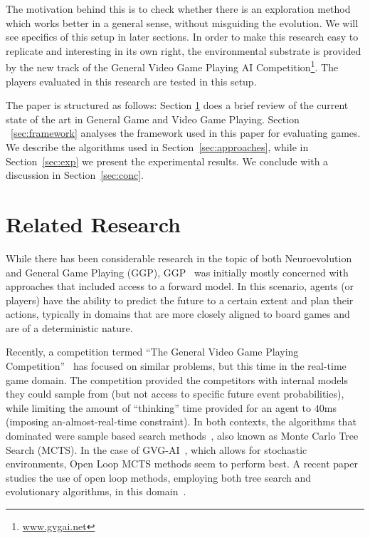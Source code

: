 \documentclass[conference]{IEEEtran}
\begin{document}
The motivation behind this is to check whether there is an exploration method which works better in a general sense, without misguiding the evolution. We will see specifics of this setup in later sections. In order to make this research easy to replicate and interesting in its own right, the environmental substrate is provided by the new track of the General Video Game Playing AI Competition\footnote{\url{www.gvgai.net}}. The players evaluated in this research are tested in this setup.

The paper is structured as follows: Section \ref{sec:lit} does a brief review of the current state of the art in General Game and Video Game Playing. Section ~\ref{sec:framework} analyses the framework used in this paper for evaluating games. We describe the algorithms used in Section~\ref{sec:approaches}, while in Section~\ref{sec:exp} we present the experimental results. We conclude with a discussion in Section~\ref{sec:conc}. 
 
\section{Related Research} \label{sec:lit}

While there has been considerable research in the topic of both Neuroevolution and General Game Playing (GGP), GGP~\cite{genesereth2005general} was initially mostly concerned with approaches that included access to a forward model. In this scenario, agents (or players) have the ability to predict the future to a certain extent and plan their actions, typically in domains that are more closely aligned to board games and are of a deterministic nature.

Recently, a competition termed ``The General Video Game Playing Competition''~\cite{Perez2015} has focused on similar problems, but this time in the real-time game domain. The competition provided the competitors with internal models they could sample from (but not access to specific future event probabilities), while limiting the amount of ``thinking'' time provided for an agent to $40$ms (imposing an-almost-real-time constraint). In both contexts, the algorithms that dominated were sample based search methods~\cite{finnsson2008simulation, Perez2015}, also known as Monte Carlo Tree Search (MCTS). In the case of GVG-AI~\cite{Perez2015}, which allows for stochastic environments, Open Loop MCTS methods seem to perform best. A recent paper studies the use of open loop methods, employing both tree search and evolutionary algorithms, in this domain~\cite{Perez2015a}.
\end{document}
